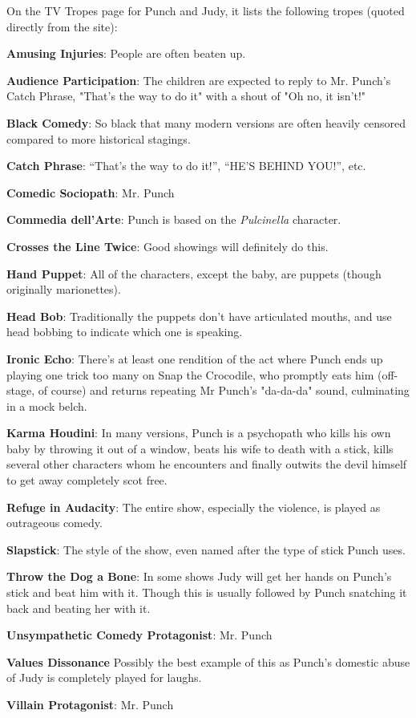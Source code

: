 On the TV Tropes page for Punch and Judy, it lists the following tropes (quoted
directly from the site):

\begin{compactitem}
  \item \textbf{Amusing Injuries}: People are often beaten up.
  \item \textbf{Audience Participation}: The children are expected to reply to Mr. Punch's Catch Phrase, "That's the way to do it" with a shout of "Oh no, it isn't!"
  \item \textbf{Black Comedy}: So black that many modern versions are often heavily censored compared to more historical stagings.
  \item \textbf{Catch Phrase}: ``That's the way to do it!'', ``HE'S BEHIND
    YOU!'', etc.
  \item \textbf{Comedic Sociopath}: Mr. Punch
  \item \textbf{Commedia dell'Arte}: Punch is based on the \emph{Pulcinella} character.
  \item \textbf{Crosses the Line Twice}: Good showings will definitely do this.
  \item \textbf{Hand Puppet}: All of the characters, except the baby, are
    puppets (though originally marionettes).
  \item \textbf{Head Bob}: Traditionally the puppets don't have articulated mouths, and use head bobbing to indicate which one is speaking.
  \item \textbf{Ironic Echo}: There's at least one rendition of the act where Punch ends up playing one trick too many on Snap the Crocodile, who promptly eats him (off-stage, of course) and returns repeating Mr Punch's "da-da-da" sound, culminating in a mock belch.
  \item \textbf{Karma Houdini}: In many versions, Punch is a psychopath who kills his own baby by throwing it out of a window, beats his wife to death with a stick, kills several other characters whom he encounters and finally outwits the devil himself to get away completely scot free.
  \item \textbf{Refuge in Audacity}: The entire show, especially the violence, is played as outrageous comedy.
  \item \textbf{Slapstick}: The style of the show, even named after the type of stick Punch uses.
  \item \textbf{Throw the Dog a Bone}: In some shows Judy will get her hands on Punch's stick and beat him with it. Though this is usually followed by Punch snatching it back and beating her with it.
  \item \textbf{Unsympathetic Comedy Protagonist}: Mr. Punch
  \item \textbf{Values Dissonance} Possibly the best example of this as Punch's domestic abuse of Judy is completely played for laughs.
  \item \textbf{Villain Protagonist}: Mr. Punch
\end{compactitem}

